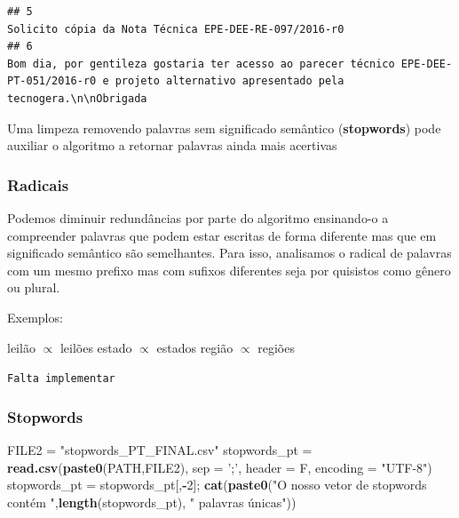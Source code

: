 \documentclass[]{article}
\newenvironment{Shaded}{\begin{snugshade}}{\end{snugshade}}
\newcommand{\KeywordTok}[1]{\textcolor[rgb]{0.13,0.29,0.53}{\textbf{#1}}}
\newcommand{\DataTypeTok}[1]{\textcolor[rgb]{0.13,0.29,0.53}{#1}}
\newcommand{\DecValTok}[1]{\textcolor[rgb]{0.00,0.00,0.81}{#1}}
\newcommand{\StringTok}[1]{\textcolor[rgb]{0.31,0.60,0.02}{#1}}
\newcommand{\OperatorTok}[1]{\textcolor[rgb]{0.81,0.36,0.00}{\textbf{#1}}}
\newcommand{\NormalTok}[1]{#1}
\begin{document}
\begin{verbatim}
## 5                                                                                                                                                                                                                                                                                                                                                                                                                                                                                                       Solicito cópia da Nota Técnica EPE-DEE-RE-097/2016-r0
## 6                                                                                                                                                                                                                                                                                                                                                                                                          Bom dia, por gentileza gostaria ter acesso ao parecer técnico EPE-DEE-PT-051/2016-r0 e projeto alternativo apresentado pela tecnogera.\n\nObrigada
\end{verbatim}

Uma limpeza removendo palavras sem significado semântico
(\textbf{stopwords}) pode auxiliar o algoritmo a retornar palavras ainda
mais acertivas

\subsubsection{Radicais}\label{radicais}

Podemos diminuir redundâncias por parte do algoritmo ensinando-o a
compreender palavras que podem estar escritas de forma diferente mas que
em significado semântico são semelhantes. Para isso, analisamos o
radical de palavras com um mesmo prefixo mas com sufixos diferentes seja
por quisistos como gênero ou plural.

Exemplos:

leilão \(\propto\) leilões estado \(\propto\) estados região \(\propto\)
regiões

\texttt{Falta\ implementar}

\subsubsection{Stopwords}\label{stopwords}

\begin{Shaded}
\begin{Highlighting}[]
\NormalTok{FILE2 =}\StringTok{ "stopwords_PT_FINAL.csv"}
\NormalTok{stopwords_pt =}\StringTok{ }\KeywordTok{read.csv}\NormalTok{(}\KeywordTok{paste0}\NormalTok{(PATH,FILE2), }\DataTypeTok{sep =} \StringTok{';'}\NormalTok{, }\DataTypeTok{header =}\NormalTok{ F, }\DataTypeTok{encoding =} \StringTok{"UTF-8"}\NormalTok{)}
\NormalTok{stopwords_pt =}\StringTok{ }\NormalTok{stopwords_pt[,}\OperatorTok{-}\DecValTok{2}\NormalTok{]; }
\KeywordTok{cat}\NormalTok{(}\KeywordTok{paste0}\NormalTok{(}\StringTok{"O nosso vetor de stopwords contém "}\NormalTok{,}\KeywordTok{length}\NormalTok{(stopwords_pt), }\StringTok{" palavras únicas"}\NormalTok{))}
\end{Highlighting}
\end{Shaded}
\end{document}
